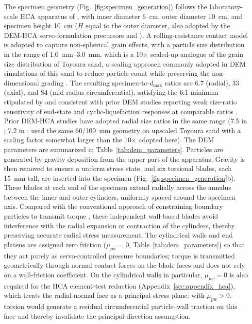 \documentclass[a4paper,fleqn]{cas-sc}
\begin{document}
The specimen geometry (Fig.~\ref{fig:specimen_generation}) follows the laboratory-scale HCA apparatus of \citet{Vargas2020}, with inner diameter \SI{6}{cm}, outer diameter \SI{10}{cm}, and specimen height \SI{10}{cm} ($H$ equal to the outer diameter, also adopted by the DEM-HCA servo-formulation precursors \citet{Han2024jgs} and \citet{Ma2024}). A rolling-resistance contact model \citep{IwashitaOda1998,WensrichKatterfeld2012} is adopted to capture non-spherical grain effects, with a particle size distribution in the range of \SIrange{1.0}{3.0}{mm}, which is a 10$\times$ scaled-up analogue of the grain size distribution of Toyoura sand, a scaling approach commonly adopted in DEM simulations of this sand to reduce particle count while preserving the non-dimensional grading \citep{Song2024}. The resulting specimen-to-$d_{\max}$ ratios are 6.7 (radial), 33 (axial), and 84 (mid-radius circumferential), satisfying the 6:1 minimum stipulated by \citet{ASTM_D7181,ASTM_D4767} and consistent with prior DEM studies reporting weak size-ratio sensitivity of end-state and cyclic-liquefaction responses at comparable ratios \citep{Huang2014,KuhnRenken2014}. Prior DEM-HCA studies have adopted radial size ratios in the same range (7.5 in \citealt{Shi2021}; 7.2 in \citealt{Liu2021}; \citealt{Song2024} used the same 60/100~mm geometry on upscaled Toyoura sand with a scaling factor somewhat larger than the 10$\times$ adopted here). The DEM parameters are summarized in Table~\ref{tab:dem_parameters}. Particles are generated by gravity deposition from the upper part of the apparatus. Gravity is then removed to ensure a uniform stress state, and six torsional blades, each 15~mm tall, are inserted into the specimen (Fig.~\ref{fig:specimen_generation}b). Three blades at each end of the specimen extend radially across the annulus between the inner and outer cylinders, uniformly spaced around the specimen axis. Compared with the conventional approach of constraining boundary particles to transmit torque \citep[e.g.,][]{LiZhangGutierrez2015,Liu2021}, these independent wall-based blades avoid interference with the radial expansion or contraction of the cylinders, thereby preserving accurate radial stress measurement. The cylindrical walls and end platens are assigned zero friction ($\mu_{pw}=0$, Table~\ref{tab:dem_parameters}) so that they act purely as servo-controlled pressure boundaries; torque is transmitted geometrically through normal contact forces on the blade faces and does not rely on a wall-friction coefficient. On the cylindrical walls in particular, $\mu_{pw}=0$ is also required for the HCA element-test reduction (Appendix~\ref{sec:appendix_hca}), which treats the radial-normal face as a principal-stress plane: with $\mu_{pw}>0$, torsion would generate a residual circumferential particle--wall traction on this face and thereby invalidate the principal-direction assumption.
\end{document}
